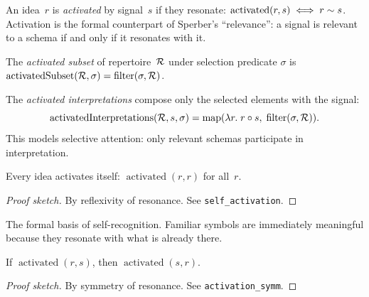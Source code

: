 \begin{definition}[Activation]
\label{def:activation}
An idea~$r$ is \emph{activated} by signal~$s$ if they resonate:
$\operatorname{activated}(r, s) \iff r \sim s$.
Activation is the formal counterpart of Sperber's ``relevance'': a
signal is relevant to a schema if and only if it resonates with it.
\end{definition}

\begin{definition}
\label{def:activated-subset}
The \emph{activated subset} of repertoire~$\mathcal{R}$ under selection
predicate $\sigma$ is $\operatorname{activatedSubset}(\mathcal{R}, \sigma)
= \operatorname{filter}(\sigma, \mathcal{R})$.
\end{definition}

\begin{definition}
\label{def:activated-interp}
The \emph{activated interpretations} compose only the selected elements
with the signal:
\[
  \operatorname{activatedInterpretations}(\mathcal{R}, s, \sigma)
  = \operatorname{map}(\lambda r.\; r \circ s,\;
    \operatorname{filter}(\sigma, \mathcal{R})).
\]
This models selective attention: only relevant schemas participate in
interpretation.
\end{definition}

\begin{theorem}
\label{thm:self-activation}
Every idea activates itself: $\operatorname{activated}(r, r)$ for all~$r$.
\end{theorem}

\begin{proof}[Proof sketch]
By reflexivity of resonance.  See \texttt{self\_activation}.
\end{proof}

\begin{remark}
The formal basis of self-recognition.  Familiar symbols are immediately
meaningful because they resonate with what is already there.
\end{remark}

\begin{theorem}
\label{thm:activation-symm}
If $\operatorname{activated}(r, s)$, then $\operatorname{activated}(s, r)$.
\end{theorem}

\begin{proof}[Proof sketch]
By symmetry of resonance.  See \texttt{activation\_symm}.
\end{proof}

